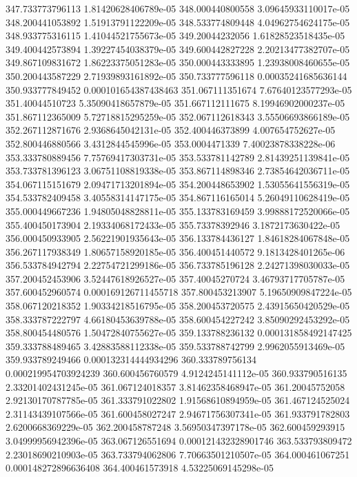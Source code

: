 {347.733773796113 1.81420628406789e-05
348.000440800558 3.09645933110017e-05
348.200441053892 1.51913791122209e-05
348.533774809448 4.04962754624175e-05
348.933775316115 1.41044521755673e-05
349.20044232056 1.61828523518435e-05
349.400442573894 1.39227454038379e-05
349.600442827228 2.20213477382707e-05
349.867109831672 1.86223375051283e-05
350.000443333895 1.23938008460655e-05
350.200443587229 2.71939893161892e-05
350.733777596118 0.00035241685636144
350.933777849452 0.000101654387438463
351.067111351674 7.67640123577293e-05
351.40044510723 5.35090418657879e-05
351.667112111675 8.19946902000237e-05
351.867112365009 5.72718815295259e-05
352.067112618343 3.55506693866189e-05
352.267112871676 2.9368645042131e-05
352.400446373899 4.007654752627e-05
352.800446880566 3.4312844545996e-05
353.0004471339 7.40023878338228e-06
353.333780889456 7.75769417303731e-05
353.533781142789 2.81439251139841e-05
353.733781396123 3.06751108819338e-05
353.867114898346 2.73854642036711e-05
354.067115151679 2.09471713201894e-05
354.200448653902 1.53055641556319e-05
354.533782409458 3.40558314147175e-05
354.867116165014 5.26049110628419e-05
355.000449667236 1.94805048828811e-05
355.133783169459 3.99888172520066e-05
355.400450173904 2.19334068172433e-05
355.73378392946 3.1872173630422e-05
356.000450933905 2.56221901935643e-05
356.133784436127 1.84618284067848e-05
356.267117938349 1.80657158920185e-05
356.400451440572 9.1813428401265e-06
356.533784942794 2.22754721299186e-05
356.733785196128 2.24271398030033e-05
357.200452453906 3.52447618926527e-05
357.40045270724 3.46793717705787e-05
357.600452960574 0.000169126711455718
357.800453213907 5.19650909847224e-05
358.067120218352 1.90334218516795e-05
358.200453720575 2.43915650420529e-05
358.333787222797 4.66180453639788e-05
358.600454227242 3.85090292453292e-05
358.800454480576 1.50472840755627e-05
359.133788236132 0.000131858492147425
359.333788489465 3.42883588112338e-05
359.533788742799 2.9962055913469e-05
359.933789249466 0.000132314444934296
360.333789756134 0.000219954703924239
360.600456760579 4.9124245141112e-05
360.933790516135 2.33201402431245e-05
361.067124018357 3.81462358468947e-05
361.20045752058 2.92130170787785e-05
361.333791022802 1.91568610894959e-05
361.467124525024 2.31143439107566e-05
361.600458027247 2.94671756307341e-05
361.933791782803 2.6200668369229e-05
362.200458787248 3.56950347397178e-05
362.600459293915 3.04999956942396e-05
363.067126551694 0.000121432328901746
363.533793809472 2.23018690210903e-05
363.733794062806 7.70663501210507e-05
364.000461067251 0.000148272896636408
364.400461573918 4.53225069145298e-05
}
